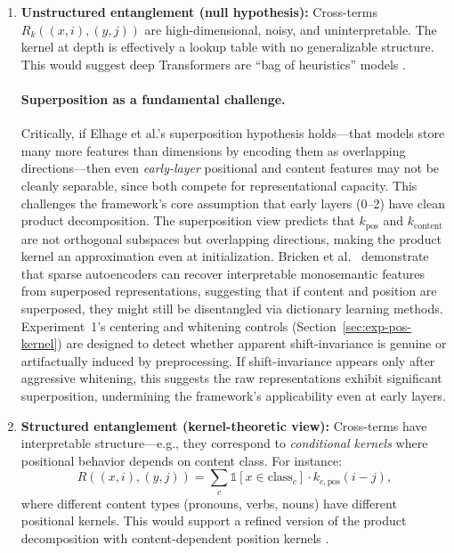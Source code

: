 \documentclass[11pt]{article}
\theoremstyle{definition}
\begin{document}
\begin{enumerate}
    \item \textbf{Unstructured entanglement (null hypothesis):} Cross-terms $R_k((x,i),(y,j))$ are high-dimensional, noisy, and uninterpretable. The kernel at depth is effectively a lookup table with no generalizable structure. This would suggest deep Transformers are ``bag of heuristics'' models \cite{elhage2023superposition}.

    \paragraph{Superposition as a fundamental challenge.} Critically, if Elhage et al.'s superposition hypothesis \cite{elhage2023superposition} holds---that models store many more features than dimensions by encoding them as overlapping directions---then even \emph{early-layer} positional and content features may not be cleanly separable, since both compete for representational capacity. This challenges the framework's core assumption that early layers (0--2) have clean product decomposition. The superposition view predicts that $k_{\text{pos}}$ and $k_{\text{content}}$ are not orthogonal subspaces but overlapping directions, making the product kernel an approximation even at initialization. Bricken et al.\ \cite{bricken2023monosemanticity} demonstrate that sparse autoencoders can recover interpretable monosemantic features from superposed representations, suggesting that if content and position are superposed, they might still be disentangled via dictionary learning methods. Experiment~1's centering and whitening controls (Section~\ref{sec:exp-pos-kernel}) are designed to detect whether apparent shift-invariance is genuine or artifactually induced by preprocessing. If shift-invariance appears only after aggressive whitening, this suggests the raw representations exhibit significant superposition, undermining the framework's applicability even at early layers.

    \item \textbf{Structured entanglement (kernel-theoretic view):} Cross-terms have interpretable structure---e.g., they correspond to \emph{conditional kernels} where positional behavior depends on content class. For instance:
    \[
    R((x,i),(y,j)) = \sum_c \mathbb{1}[x \in \text{class}_c] \cdot k_{c,\text{pos}}(i-j),
    \]
    where different content types (pronouns, verbs, nouns) have different positional kernels. This would support a refined version of the product decomposition with content-dependent position kernels \cite{voita2019headpruning,clark2019analyzing}.


\end{enumerate}
\end{document}
